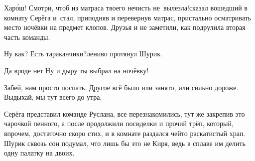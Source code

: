 \diagdash Хар\'{о}ш! Смотри, чтоб из матраса твоего нечисть не~вылезла!\mdash сказал вошедший в комнату Серёга и~стал, приподняв и перевернув матрас, пристально осматривать место ночёвки на предмет клопов. Друзья и не заметили, как подрулила вторая часть команды.

\diagdash Ну как? Есть тараканчики?\mdash лениво протянул Шурик.

\diagdash Да вроде нет\myldots{} Ну и дыру ты выбрал на ночёвку! 

\diagdash Забей, нам просто поспать. Другое всё было или занято, или сильно дороже. Выдыхай, мы тут всего до утра.

Серёга представил команде Руслана, все перезнакомились, тут же закрепив это чарочкой пенного, а после продолжили посиделки и прочий трёп, который, впрочем, достаточно скоро стих, и в комнате раздался чей\sdash то раскатистый храп. Шурик сквозь сон подумал, что лишь бы это не Киря, ведь в сплаве им делить одну палатку на двоих.

\vspace{-0.2cm}
\begin{center}
\end{center}